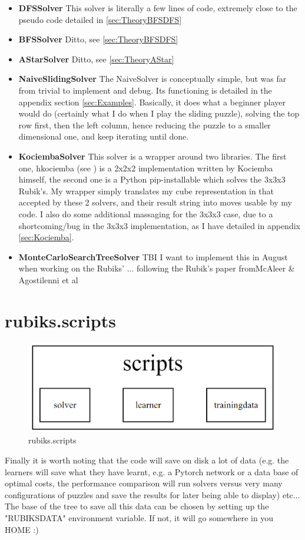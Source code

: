 \begin{itemize}
\item \textbf{DFSSolver} This solver is literally a few lines of code, extremely close to the pseudo code detailed in \ref{sec:TheoryBFSDFS}
\item \textbf{BFSSolver} Ditto, see \ref{sec:TheoryBFSDFS}
\item \textbf{AStarSolver} Ditto, see \ref{sec:TheoryAStar}
\item \textbf{NaiveSlidingSolver} The NaiveSolver is conceptually simple, but was far from trivial to implement and debug. Its functioning is detailed in the appendix section \ref{sec:Examples}. Basically, it does what a beginner player would do (certainly what I do when I play the sliding puzzle), solving the top row first, then the left column, hence reducing the puzzle to a smaller dimensional one, and keep iterating until done.
\item \textbf{KociembaSolver} This solver is a wrapper around two libraries. The first one, hkociemba (see \cite{HKociemba}) is a 2x2x2 implementation written by Kociemba himself, the second one is a Python pip-installable which solves the 3x3x3 Rubik's. My  wrapper simply translates my cube representation in that accepted by these 2 solvers, and their result string into moves usable by my code. I also do some additional massaging for the 3x3x3 case, due to a shortcoming/bug in the 3x3x3 implementation, as I have detailed in appendix \ref{sec:Kociemba}.
\item \textbf{MonteCarloSearchTreeSolver} TBI I want to implement this in August when working on the Rubiks' ... following the Rubik's paper fromMcAleer \& Agostilenni et al \cite{https://doi.org/10.48550/arxiv.1805.07470}
\end{itemize}

\section{rubiks.scripts}

\begin{figure}[H]
\centering
\includegraphics[scale=0.25]{./Figures/codebasescripts}
\caption[Codebase]{rubiks.scripts}
\label{fig:Codebasescripts}
\end{figure}

Finally it is worth noting that the code will save on disk a lot of data (e.g. the learners will save what they have learnt, e.g. a Pytorch network or a data base of optimal costs, the performance comparison will run solvers versus very many configurations of puzzles and save the results for later being able to display) etc... The base of the tree to save all this data can be chosen by setting up the "RUBIKSDATA" environment variable. If not, it will go somewhere in you HOME :)
